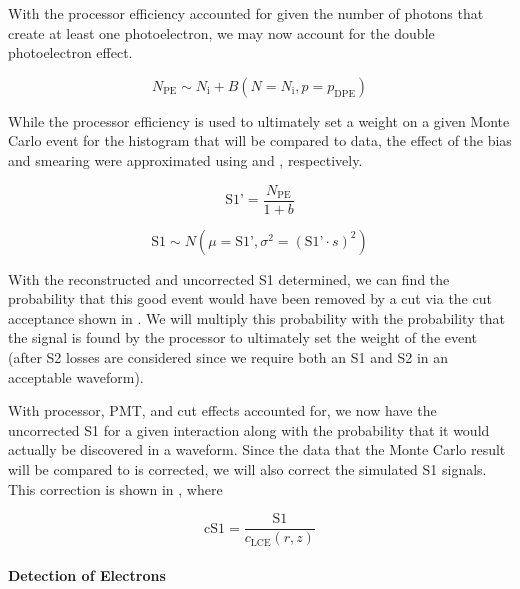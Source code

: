 With the processor efficiency accounted for given the number of photons that create at least one photoelectron, we may now account for the double photoelectron effect.  

\begin{equation}
        N_{\textrm{PE}} \sim N_{\textrm{i}} + B(N=N_{\textrm{i}}, p=p_{\textrm{DPE}})
\end{equation}


While the processor efficiency is used to ultimately set a weight on a given Monte Carlo event for the histogram that will be compared to data, the effect of the bias and smearing were approximated using  and , respectively.  

\begin{equation}
        \label{eqn:xe1t_s1_bias}
        \textrm{S1'} = \frac{N_{\textrm{PE}}}{1 + b}
\end{equation}


\begin{equation}
        \label{eqn:xe1t_s1_smearing}
        \textrm{S1} \sim N(\mu = \textrm{S1'}, \sigma^2 = (\textrm{S1'} \cdot s)^2)
\end{equation}


With the reconstructed and uncorrected S1 determined, we can find the probability that this good event would have been removed by a cut via the cut acceptance shown in .  We will multiply this probability with the probability that the signal is found by the processor to ultimately set the weight of the event (after S2 losses are considered since we require both an S1 and S2 in an acceptable waveform).


With processor, PMT, and cut effects accounted for, we now have the uncorrected S1 for a given interaction along with the probability that it would actually be discovered in a waveform.  Since the data that the Monte Carlo result will be compared to is corrected, we will also correct the simulated S1 signals.  This correction is shown in , where 

\begin{equation}
        \label{eqn:xe1t_s1_recorrect}
        \textrm{cS1} = \frac{\textrm{S1}}{c_{\textrm{LCE}}(r, z)}
\end{equation}




\paragraph{Detection of Electrons}
\label{sec:xe1t_mc_electrons}


